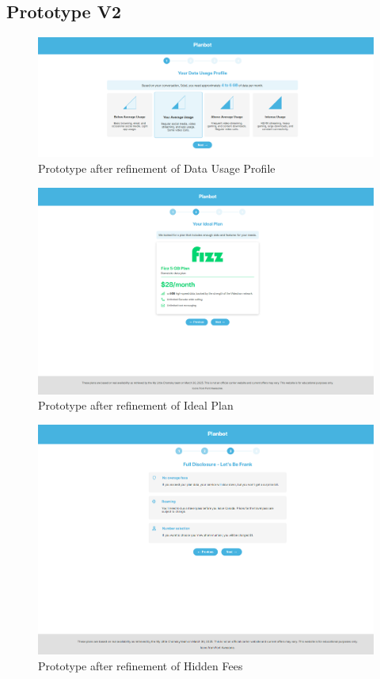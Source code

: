 \documentclass[conference]{IEEEtran}
\begin{document}
\subsection{Prototype V2}
\begin{figure}[H]
    \centering
    \includegraphics[width=1\linewidth]{Prototype V2/1-357.png}
    \caption{Prototype after refinement of Data Usage Profile}
    \label{fig:user flow}
\end{figure}
\begin{figure}[H]
    \centering
    \includegraphics[width=1\linewidth]{Prototype V2/2-357.png}
    \caption{Prototype after refinement of Ideal Plan}
    \label{fig:user flow}
\end{figure}
\begin{figure}[H]
    \centering
    \includegraphics[width=1\linewidth]{Prototype V2/3-357.png}
    \caption{Prototype after refinement of Hidden Fees}
    \label{fig:user flow}
\end{figure}
\end{document}
